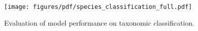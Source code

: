 \begin{figure}[ht]
    \centering
    \texttt{[image: figures/pdf/species\_classification\_full.pdf]}
    \caption{Evaluation of model performance on taxonomic classification.}
    \label{fig:species_classification}
\end{figure}